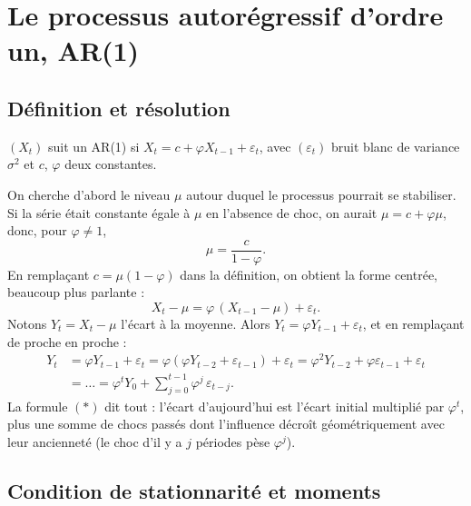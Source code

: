\documentclass[11pt,a4paper]{article}
\begin{document}
\section{Le processus autorégressif d'ordre un, AR(1)}

\subsection{Définition et résolution}

\begin{definition}
$(X_t)$ suit un AR(1) si $X_t = c + \varphi X_{t-1} + \varepsilon_t$, avec $(\varepsilon_t)$ bruit blanc de variance $\sigma^2$ et $c$, $\varphi$ deux constantes.
\end{definition}

On cherche d'abord le niveau $\mu$ autour duquel le processus pourrait se stabiliser. Si la série était constante égale à $\mu$ en l'absence de choc, on aurait $\mu = c + \varphi\mu$, donc, pour $\varphi \ne 1$,
\[
\mu = \frac{c}{1-\varphi}.
\]
En remplaçant $c = \mu(1-\varphi)$ dans la définition, on obtient la forme \og centrée\fg{}, beaucoup plus parlante :
\begin{equation}\label{eq:ar1c}
X_t - \mu = \varphi\,(X_{t-1}-\mu) + \varepsilon_t.
\end{equation}
Notons $Y_t = X_t - \mu$ l'écart à la moyenne. Alors $Y_t = \varphi Y_{t-1} + \varepsilon_t$, et en remplaçant de proche en proche :
\begin{align*}
Y_t &= \varphi Y_{t-1} + \varepsilon_t = \varphi(\varphi Y_{t-2} + \varepsilon_{t-1}) + \varepsilon_t = \varphi^2 Y_{t-2} + \varphi\varepsilon_{t-1} + \varepsilon_t\\
&= \dots = \varphi^t Y_0 + \sum_{j=0}^{t-1}\varphi^j\,\varepsilon_{t-j}. \tag{$\ast$}
\end{align*}
La formule $(\ast)$ dit tout : l'écart d'aujourd'hui est l'écart initial multiplié par $\varphi^t$, plus une somme de chocs passés dont l'influence décroît géométriquement avec leur ancienneté (le choc d'il y a $j$ périodes pèse $\varphi^j$).

\subsection{Condition de stationnarité et moments}
\end{document}
